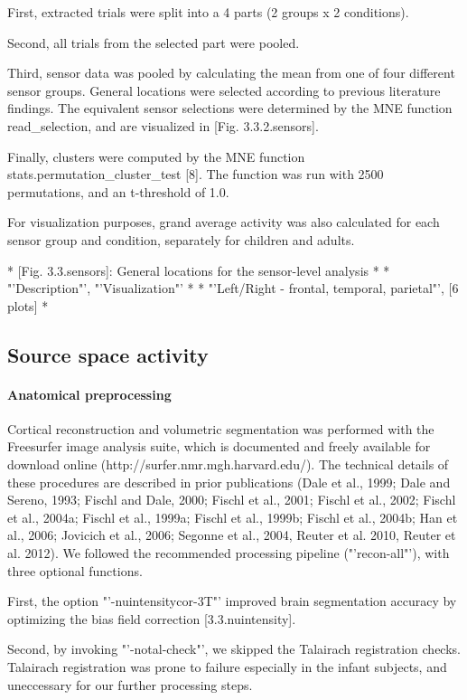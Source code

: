 First, extracted trials were split into a 4 parts (2 groups x 2 conditions).

Second, all trials from the selected part were pooled.

Third, sensor data was pooled by calculating the mean from one of four different sensor groups.
General locations were selected according to previous literature findings.
The equivalent sensor selections were determined by the MNE function read\_selection, and are visualized in [Fig. 3.3.2.sensors].

Finally, clusters were computed by the MNE function stats.permutation\_cluster\_test [8].
The function was run with 2500 permutations, and an t-threshold of 1.0.

For visualization purposes, grand average activity was also calculated for each sensor group and condition, separately for children and adults.


* [Fig. 3.3.sensors]: General locations for the sensor-level analysis *
 * "'Description"', "'Visualization"' *
 * "'Left/Right - frontal, temporal, parietal"', [6 plots] *


\subsection{Source space activity}

\paragraph{Anatomical preprocessing}
Cortical reconstruction and volumetric segmentation was performed with the Freesurfer image analysis suite, which is documented and freely available for download online (http://surfer.nmr.mgh.harvard.edu/).
The technical details of these procedures are described in prior publications (Dale et al., 1999; Dale and Sereno, 1993; Fischl and Dale, 2000; Fischl et al., 2001; Fischl et al., 2002; Fischl et al., 2004a; Fischl et al., 1999a; Fischl et al., 1999b; Fischl et al., 2004b; Han et al., 2006; Jovicich et al., 2006; Segonne et al., 2004, Reuter et al. 2010, Reuter et al. 2012).
We followed the recommended processing pipeline ("'recon-all"'), with three optional functions.

First, the option "'-nuintensitycor-3T"' improved brain segmentation accuracy by optimizing the bias field correction [3.3.nuintensity].

Second, by invoking "'-notal-check"', we skipped the Talairach registration checks.
Talairach registration was prone to failure especially in the infant subjects, and uneccessary for our further processing steps.

